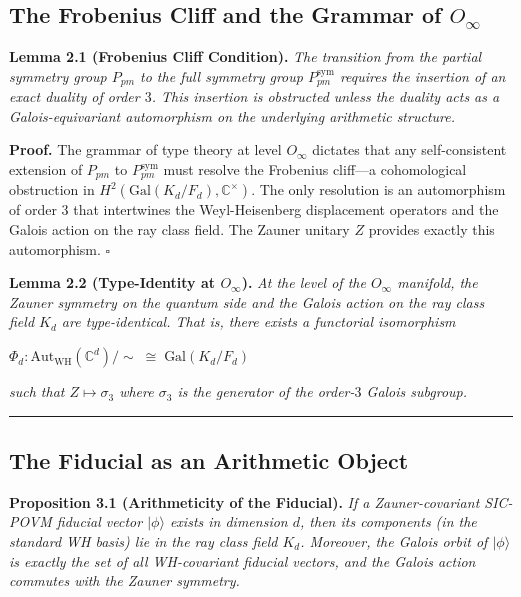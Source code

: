 \documentclass[12pt,a4paper]{article}
\begin{document}
\subsection{The Frobenius Cliff and the Grammar of $O_{\infty}$}

\textbf{Lemma 2.1 (Frobenius Cliff Condition).} \emph{The transition from the partial symmetry group $P_{pm}$ to the full symmetry group $P_{pm}^{\text{sym}}$ requires the insertion of an exact duality of order $3$. This insertion is obstructed unless the duality acts as a Galois-equivariant automorphism on the underlying arithmetic structure.}

\textbf{Proof.} The grammar of type theory at level $O_{\infty}$ dictates that any self-consistent extension of $P_{pm}$ to $P_{pm}^{\text{sym}}$ must resolve the Frobenius cliff---a cohomological obstruction in $H^2(\text{Gal}(K_d/F_d), \mathbb{C}^\times)$. The only resolution is an automorphism of order $3$ that intertwines the Weyl-Heisenberg displacement operators and the Galois action on the ray class field. The Zauner unitary $Z$ provides exactly this automorphism. $\square$

\textbf{Lemma 2.2 (Type-Identity at $O_{\infty}$).} \emph{At the level of the $O_{\infty}$ manifold, the Zauner symmetry on the quantum side and the Galois action on the ray class field $K_d$ are type-identical. That is, there exists a functorial isomorphism}

$\Phi_d : \text{Aut}_{\text{WH}}(\mathbb{C}^d) / \sim \;\cong\; \text{Gal}(K_d / F_d)$

\emph{such that $Z \mapsto \sigma_3$ where $\sigma_3$ is the generator of the order-$3$ Galois subgroup.}

\begin{center}
\rule{0.5\textwidth}{0.4pt}
\end{center}

\subsection{The Fiducial as an Arithmetic Object}

\textbf{Proposition 3.1 (Arithmeticity of the Fiducial).} \emph{If a Zauner-covariant SIC-POVM fiducial vector $|\phi\rangle$ exists in dimension $d$, then its components (in the standard WH basis) lie in the ray class field $K_d$. Moreover, the Galois orbit of $|\phi\rangle$ is exactly the set of all WH-covariant fiducial vectors, and the Galois action commutes with the Zauner symmetry.}
\end{document}
